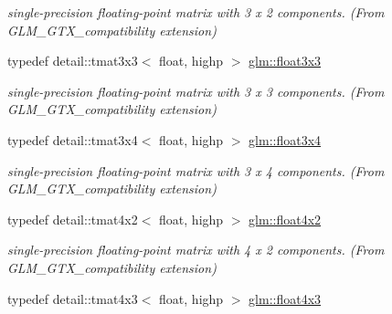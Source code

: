 \begin{DoxyCompactItemize}
\begin{DoxyCompactList}\small\item\em single-\/precision floating-\/point matrix with 3 x 2 components. (From G\+L\+M\+\_\+\+G\+T\+X\+\_\+compatibility extension) \end{DoxyCompactList}\item 
typedef detail\+::tmat3x3$<$ float, highp $>$ \hyperlink{group__gtx__compatibility_ga11458ecd63c32b7e502d90091a6d0a6c}{glm\+::float3x3}\hypertarget{group__gtx__compatibility_ga11458ecd63c32b7e502d90091a6d0a6c}{}\label{group__gtx__compatibility_ga11458ecd63c32b7e502d90091a6d0a6c}

\begin{DoxyCompactList}\small\item\em single-\/precision floating-\/point matrix with 3 x 3 components. (From G\+L\+M\+\_\+\+G\+T\+X\+\_\+compatibility extension) \end{DoxyCompactList}\item 
typedef detail\+::tmat3x4$<$ float, highp $>$ \hyperlink{group__gtx__compatibility_ga53eb75b08b92aa34886397150c983943}{glm\+::float3x4}\hypertarget{group__gtx__compatibility_ga53eb75b08b92aa34886397150c983943}{}\label{group__gtx__compatibility_ga53eb75b08b92aa34886397150c983943}

\begin{DoxyCompactList}\small\item\em single-\/precision floating-\/point matrix with 3 x 4 components. (From G\+L\+M\+\_\+\+G\+T\+X\+\_\+compatibility extension) \end{DoxyCompactList}\item 
typedef detail\+::tmat4x2$<$ float, highp $>$ \hyperlink{group__gtx__compatibility_gab805aa2d6bbd5edddf78bd2e9322e6c7}{glm\+::float4x2}\hypertarget{group__gtx__compatibility_gab805aa2d6bbd5edddf78bd2e9322e6c7}{}\label{group__gtx__compatibility_gab805aa2d6bbd5edddf78bd2e9322e6c7}

\begin{DoxyCompactList}\small\item\em single-\/precision floating-\/point matrix with 4 x 2 components. (From G\+L\+M\+\_\+\+G\+T\+X\+\_\+compatibility extension) \end{DoxyCompactList}\item 
typedef detail\+::tmat4x3$<$ float, highp $>$ \hyperlink{group__gtx__compatibility_ga72398a5d715031923beca8907c52f5d6}{glm\+::float4x3}\hypertarget{group__gtx__compatibility_ga72398a5d715031923beca8907c52f5d6}{}\label{group__gtx__compatibility_ga72398a5d715031923beca8907c52f5d6}


\end{DoxyCompactItemize}
